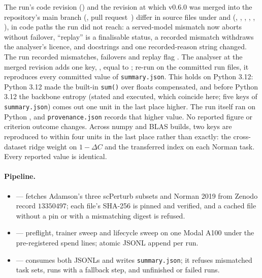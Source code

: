 \documentclass[10pt,a4paper]{article}
\begin{document}
\begin{sloppypar}
The run's code revision (\resGitSha) and the revision at which v0.6.0 was merged into
the repository's main branch
(\resLandSha, pull request~\resLandPR) differ in \resPostRunPathCount{} source files under
 and  (,
,
,
,
,
), in code paths the run did not reach: a served-model
mismatch now aborts without failover, ``replay'' is a finalisable status, a recorded
mismatch withdraws the analyser's licence, and docstrings and one recorded-reason
string changed. The run recorded \resServedMismatch{} mismatches, \resNFailover{}
failovers and replay flag \resReplay. The analyser at the merged revision adds one key,
, equal to \resServedMismatch; re-run on the committed run
files, it reproduces every committed value of \texttt{summary.json}.
This holds on Python 3.12: Python 3.12 made the built-in \texttt{sum()} over floats
compensated, and before Python 3.12 the backbone entropy (stated and executed, which coincide
here; five keys of \texttt{summary.json}) comes out one unit in the last place higher. The
run itself ran on Python \resRunPython, and \texttt{provenance.json} records that higher
value. No reported figure or criterion outcome changes.
Across numpy and BLAS builds, two keys are reproduced to within four units in the last place
rather than exactly: the cross-dataset ridge weight on $1-\Delta C$ and the transferred index
on each Norman task. Every reported value is identical.
\end{sloppypar}

\paragraph{Pipeline.}
\begin{sloppypar}
\begin{itemize}[leftmargin=*,topsep=0pt,itemsep=0pt]
  \item {} --- fetches Adamson's
        three scPerturb subsets and Norman 2019 from Zenodo record
        $13350497$; each file's SHA-256 is pinned and verified, and a
        cached file without a pin or with a mismatching digest is refused.
  \item {} --- preflight, trainer sweep and
        lifecycle sweep on one Modal A100 under the pre-registered spend
        lines; atomic JSONL append per run.
  \item {} ---
        consumes both JSONLs and writes \texttt{summary.json}; it refuses
        mismatched task sets, runs with a fallback step, and unfinished or
        failed runs.
\end{itemize}
\end{sloppypar}
\end{document}
